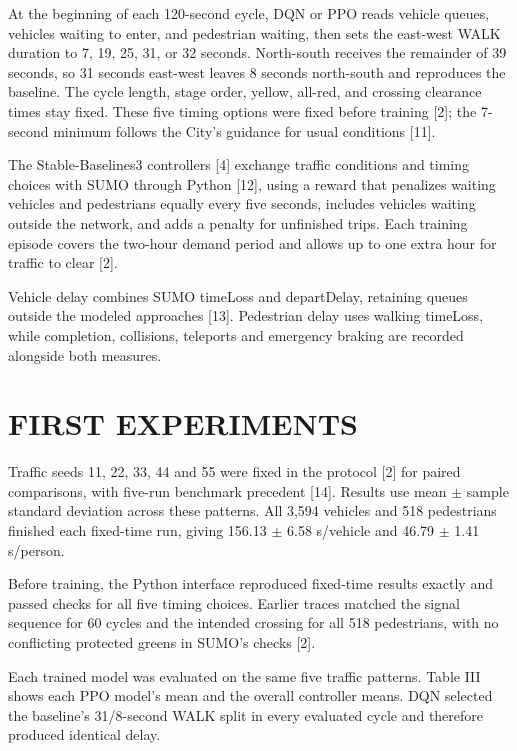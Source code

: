 \documentclass[conference]{IEEEtran}
\begin{document}
At the beginning of each 120-second cycle, DQN or PPO reads vehicle queues, vehicles waiting to enter, and pedestrian waiting, then sets the east-west WALK duration to 7, 19, 25, 31, or 32 seconds. North-south receives the remainder of 39 seconds, so 31 seconds east-west leaves 8 seconds north-south and reproduces the baseline. The cycle length, stage order, yellow, all-red, and crossing clearance times stay fixed. These five timing options were fixed before training [2]; the 7-second minimum follows the City's guidance for usual conditions [11].

The Stable-Baselines3 controllers [4] exchange traffic conditions and timing choices with SUMO through Python [12], using a reward that penalizes waiting vehicles and pedestrians equally every five seconds, includes vehicles waiting outside the network, and adds a penalty for unfinished trips. Each training episode covers the two-hour demand period and allows up to one extra hour for traffic to clear [2].

Vehicle delay combines SUMO timeLoss and departDelay, retaining queues outside the modeled approaches [13]. Pedestrian delay uses walking timeLoss, while completion, collisions, teleports and emergency braking are recorded alongside both measures.

\section{FIRST EXPERIMENTS}
Traffic seeds 11, 22, 33, 44 and 55 were fixed in the protocol [2] for paired comparisons, with five-run benchmark precedent [14]. Results use mean $\pm$ sample standard deviation across these patterns. All 3,594 vehicles and 518 pedestrians finished each fixed-time run, giving 156.13 $\pm$ 6.58 s/vehicle and 46.79 $\pm$ 1.41 s/person.

Before training, the Python interface reproduced fixed-time results exactly and passed checks for all five timing choices. Earlier traces matched the signal sequence for 60 cycles and the intended crossing for all 518 pedestrians, with no conflicting protected greens in SUMO's checks [2].

Each trained model was evaluated on the same five traffic patterns. Table III shows each PPO model's mean and the overall controller means. DQN selected the baseline's 31/8-second WALK split in every evaluated cycle and therefore produced identical delay.
\end{document}

